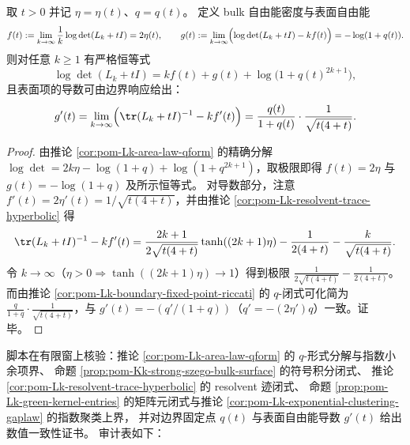 \begin{corollary}\label{cor:pom-Lk-surface-free-energy}
取 \(t>0\) 并记 \(\eta=\eta(t)\)、\(q=q(t)\)。
定义 bulk 自由能密度与表面自由能
\[
f(t):=\lim_{k\to\infty}\frac{1}{k}\log\det(L_k+tI)=2\eta(t),
\qquad
g(t):=\lim_{k\to\infty}\Bigl(\log\det(L_k+tI)-k f(t)\Bigr)=-\log(1+q(t)).
\]
则对任意 \(k\ge 1\) 有严格恒等式
\[
\log\det(L_k+tI)=k f(t)+g(t)+\log\bigl(1+q(t)^{2k+1}\bigr),
\]
且表面项的导数可由边界响应给出：
\[
g'(t)=\lim_{k\to\infty}\Bigl(\tr(L_k+tI)^{-1}-k f'(t)\Bigr)
=\frac{q(t)}{1+q(t)}\cdot \frac{1}{\sqrt{t(4+t)}}.
\]
\end{corollary}
\begin{proof}
由推论 \ref{cor:pom-Lk-area-law-qform} 的精确分解
\(
\log\det=2k\eta-\log(1+q)+\log(1+q^{2k+1})
\)，取极限即得 \(f(t)=2\eta\) 与 \(g(t)=-\log(1+q)\) 及所示恒等式。
对导数部分，注意 \(f'(t)=2\eta'(t)=1/\sqrt{t(4+t)}\)，并由推论 \ref{cor:pom-Lk-resolvent-trace-hyperbolic} 得
\[
\tr(L_k+tI)^{-1}-k f'(t)
=\frac{2k+1}{2\sqrt{t(4+t)}}\tanh((2k+1)\eta)-\frac{1}{2(4+t)}-\frac{k}{\sqrt{t(4+t)}}.
\]
令 \(k\to\infty\)（\(\eta>0\Rightarrow\tanh((2k+1)\eta)\to 1\)）得到极限
\(
\frac{1}{2\sqrt{t(4+t)}}-\frac{1}{2(4+t)}
\)。
而由推论 \ref{cor:pom-Lk-boundary-fixed-point-riccati} 的 \(q\)-闭式可化简为
\(
\frac{q}{1+q}\cdot \frac{1}{\sqrt{t(4+t)}}
\)，与 \(g'(t)=-(q'/(1+q))\)（\(q'=-(2\eta')q\)）一致。证毕。
\end{proof}

\begin{remark}\label{rem:pom-fence-green-kernel-area-law-audit}
脚本在有限窗上核验：推论 \ref{cor:pom-Lk-area-law-qform} 的 \(q\)-形式分解与指数小余项界、
命题 \ref{prop:pom-Kk-strong-szego-bulk-surface} 的符号积分闭式、
推论 \ref{cor:pom-Lk-resolvent-trace-hyperbolic} 的 resolvent 迹闭式、
命题 \ref{prop:pom-Lk-green-kernel-entries} 的矩阵元闭式与推论 \ref{cor:pom-Lk-exponential-clustering-gaplaw} 的指数聚类上界，
并对边界固定点 \(q(t)\) 与表面自由能导数 \(g'(t)\) 给出数值一致性证书。
审计表如下：

\end{remark}

